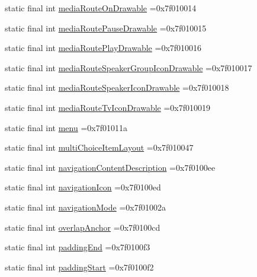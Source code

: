 \begin{DoxyCompactItemize}
\item 
static final int \hyperlink{classproject4_1_1xaria_1_1R_1_1attr_af04bebb7f3209cc8805f88938c2fc85f}{media\+Route\+On\+Drawable} =0x7f010014
\item 
static final int \hyperlink{classproject4_1_1xaria_1_1R_1_1attr_a141c8ef0564545965a99299b3e53a5b1}{media\+Route\+Pause\+Drawable} =0x7f010015
\item 
static final int \hyperlink{classproject4_1_1xaria_1_1R_1_1attr_a842679cbadf85846aa6bdad20aed5605}{media\+Route\+Play\+Drawable} =0x7f010016
\item 
static final int \hyperlink{classproject4_1_1xaria_1_1R_1_1attr_a68c06d8657e30e6f8089897ea56c111c}{media\+Route\+Speaker\+Group\+Icon\+Drawable} =0x7f010017
\item 
static final int \hyperlink{classproject4_1_1xaria_1_1R_1_1attr_a17be683bf27daf7f1bba7357c771e37c}{media\+Route\+Speaker\+Icon\+Drawable} =0x7f010018
\item 
static final int \hyperlink{classproject4_1_1xaria_1_1R_1_1attr_a493552bc8e3f9418ee812a67d41bfaac}{media\+Route\+Tv\+Icon\+Drawable} =0x7f010019
\item 
static final int \hyperlink{classproject4_1_1xaria_1_1R_1_1attr_ab48e686b20977e7b920cdc0975382a27}{menu} =0x7f01011a
\item 
static final int \hyperlink{classproject4_1_1xaria_1_1R_1_1attr_abd6a041162e4073589174b5b4b793b96}{multi\+Choice\+Item\+Layout} =0x7f010047
\item 
static final int \hyperlink{classproject4_1_1xaria_1_1R_1_1attr_a3f631916421ac95d60adb2dd40481c57}{navigation\+Content\+Description} =0x7f0100ee
\item 
static final int \hyperlink{classproject4_1_1xaria_1_1R_1_1attr_ab61b7ef4b6315b57f65be0d1e8c6a537}{navigation\+Icon} =0x7f0100ed
\item 
static final int \hyperlink{classproject4_1_1xaria_1_1R_1_1attr_a36e447722ef621ee6c9128adca581af0}{navigation\+Mode} =0x7f01002a
\item 
static final int \hyperlink{classproject4_1_1xaria_1_1R_1_1attr_a8192eab207fc35ad8f69f40598458cd0}{overlap\+Anchor} =0x7f0100cd
\item 
static final int \hyperlink{classproject4_1_1xaria_1_1R_1_1attr_af415a51e10ea1086aae8207a041fe5f2}{padding\+End} =0x7f0100f3
\item 
static final int \hyperlink{classproject4_1_1xaria_1_1R_1_1attr_a3042d6341eb03ef2f6eb5468b9ebf914}{padding\+Start} =0x7f0100f2
\item 

\end{DoxyCompactItemize}
